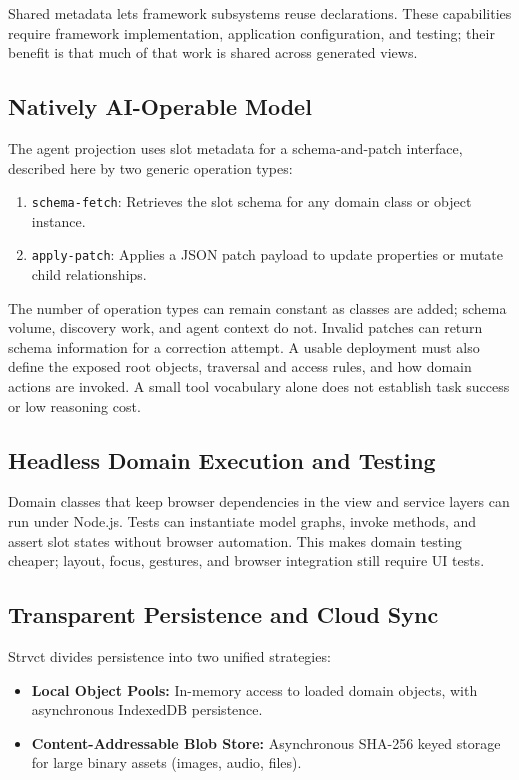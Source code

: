\documentclass[sigplan,review,anonymous,10pt]{acmart}
\begin{document}
Shared metadata lets framework subsystems reuse declarations. These capabilities require framework implementation, application configuration, and testing; their benefit is that much of that work is shared across generated views.

\subsection{Natively AI-Operable Model}
\label{sec:ai-operable}

The agent projection uses slot metadata for a schema-and-patch interface, described here by two generic operation types:
\begin{enumerate}
\item \texttt{schema-fetch}: Retrieves the slot schema for any domain class or object instance.
\item \texttt{apply-patch}: Applies a JSON patch payload to update properties or mutate child relationships.
\end{enumerate}

The number of operation types can remain constant as classes are added; schema volume, discovery work, and agent context do not. Invalid patches can return schema information for a correction attempt. A usable deployment must also define the exposed root objects, traversal and access rules, and how domain actions are invoked. A small tool vocabulary alone does not establish task success or low reasoning cost.

\subsection{Headless Domain Execution and Testing}

Domain classes that keep browser dependencies in the view and service layers can run under Node.js. Tests can instantiate model graphs, invoke methods, and assert slot states without browser automation. This makes domain testing cheaper; layout, focus, gestures, and browser integration still require UI tests.

\subsection{Transparent Persistence and Cloud Sync}

Strvct divides persistence into two unified strategies:
\begin{itemize}
\item \textbf{Local Object Pools:} In-memory access to loaded domain objects, with asynchronous IndexedDB persistence.
\item \textbf{Content-Addressable Blob Store:} Asynchronous SHA-256 keyed storage for large binary assets (images, audio, files).
\end{itemize}
\end{document}
